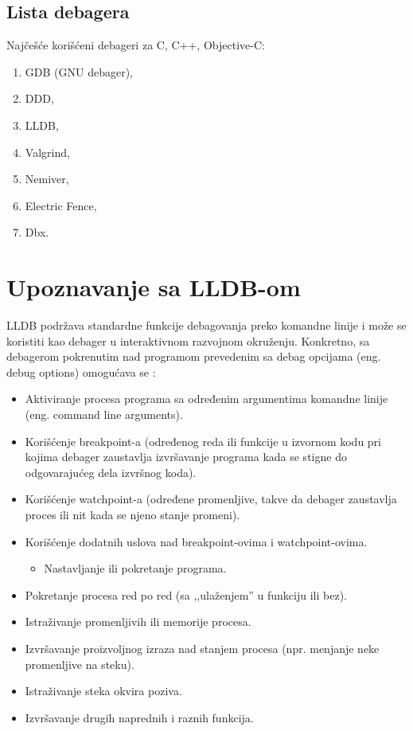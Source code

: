 \documentclass[a4paper]{article}
\begin{document}
\subsection{Lista debagera}
\label{sec:Lista debagera}

Najčešće korišćeni debageri za  C, C++, Objective-C\cite{ll_best_debuggers}\cite{up_best_debuggers}:
\begin{enumerate}
	\item GDB (GNU debager),
	\item DDD,
	\item LLDB,
	\item Valgrind,
	\item Nemiver,
	\item Electric Fence,
	\item Dbx.
\end{enumerate}

\section{Upoznavanje sa LLDB-om}
LLDB podržava standardne funkcije debagovanja preko komandne linije i može se
koristiti kao debager u interaktivnom razvojnom okruženju. Konkretno, sa
debagerom pokrenutim nad programom prevedenim sa debag opcijama (eng. debug
options) omogućava se \cite{lldb_to_gdb_map}:

\begin{itemize}
	\item{Aktiviranje procesa programa sa određenim argumentima komandne linije
		(eng. command line arguments).}
	
	\item{Korišćenje breakpoint-a (određenog reda ili funkcije u izvornom kodu pri
		kojima debager zaustavlja izvršavanje programa kada se stigne do odgovarajućeg
		dela izvršnog koda).}
	
	\item{Korišćenje watchpoint-a (određene promenljive, takve da debager zaustavlja
		proces ili nit kada se njeno stanje promeni).}
	
	\item{Korišćenje dodatnih uslova nad breakpoint-ovima i watchpoint-ovima.}
	\begin{itemize}
		\item{Nastavljanje ili pokretanje programa.}
	\end{itemize}
	
	\item{Pokretanje procesa red po red (sa ,,ulaženjem'' u funkciju ili bez).}
	
	\item{Istraživanje promenljivih ili memorije procesa.}
	
	\item{Izvršavanje proizvoljnog izraza nad stanjem procesa (npr. menjanje neke
		promenljive na steku).}
	
	\item{Istraživanje steka okvira poziva.}
	
	\item{Izvršavanje drugih naprednih i raznih funkcija.}
\end{itemize}
\end{document}
